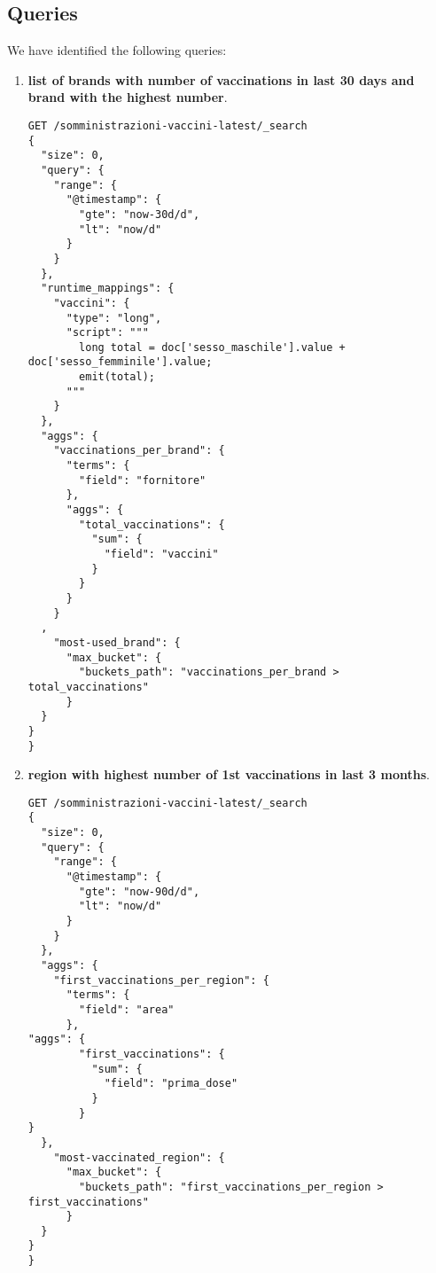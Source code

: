 \documentclass{article}
\begin{document}
\subsection{Queries}
We have identified the following queries:
\begin{enumerate}
\item \textbf{list of brands with number of vaccinations in last 30 days and brand with the highest number}.\\
\begin{lstlisting}
GET /somministrazioni-vaccini-latest/_search
{
  "size": 0,
  "query": {
    "range": {
      "@timestamp": {
        "gte": "now-30d/d",
        "lt": "now/d"
      }
    }
  },
  "runtime_mappings": {
    "vaccini": {
      "type": "long",
      "script": """
        long total = doc['sesso_maschile'].value + doc['sesso_femminile'].value;
        emit(total);
      """
    }
  },
  "aggs": {
    "vaccinations_per_brand": {
      "terms": {
        "field": "fornitore"
      },
      "aggs": {
        "total_vaccinations": {
          "sum": {
            "field": "vaccini"
          }
        }
      }
    }
  ,
    "most-used_brand": {
      "max_bucket": {
        "buckets_path": "vaccinations_per_brand > total_vaccinations" 
      }
  }
}
}
\end{lstlisting}
\item \textbf{region with highest number of 1st vaccinations in last 3 months}.\\
\begin{lstlisting}
GET /somministrazioni-vaccini-latest/_search
{
  "size": 0,
  "query": {
    "range": {
      "@timestamp": {
        "gte": "now-90d/d",
        "lt": "now/d"
      }
    }
  },
  "aggs": {
    "first_vaccinations_per_region": {
      "terms": {
        "field": "area"
      },
"aggs": {
        "first_vaccinations": {
          "sum": {
            "field": "prima_dose"
          }
        }
}
  },
    "most-vaccinated_region": {
      "max_bucket": {
        "buckets_path": "first_vaccinations_per_region > first_vaccinations" 
      }
  }
}
}


\end{lstlisting}
\end{enumerate}
\end{document}

